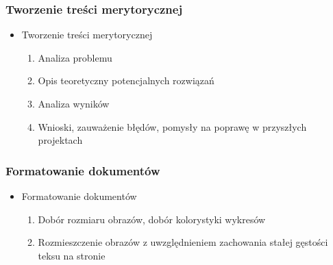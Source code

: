 \begin{frame}
    \frametitle{Tworzenie treści merytorycznej }
    \begin{itemize}[<+->]
        \item Tworzenie treści merytorycznej
            \begin{enumerate}
                \item     Analiza problemu 
                \item     Opis teoretyczny potencjalnych rozwiązań 
                \item     Analiza wyników 
                \item     Wnioski, zauważenie błędów, pomysły na poprawę w przyszłych projektach 
            \end{enumerate}
    \end{itemize} 
\end{frame}

\begin{frame}
    \frametitle{Formatowanie dokumentów }
    \begin{itemize}[<+->]
        \item Formatowanie dokumentów
            \begin{enumerate}
                \item     Dobór rozmiaru obrazów, dobór kolorystyki wykresów 
                \item     Rozmieszczenie obrazów z uwzględnieniem zachowania stałej gęstości teksu na stronie 
            \end{enumerate}
    \end{itemize} 
\end{frame}












